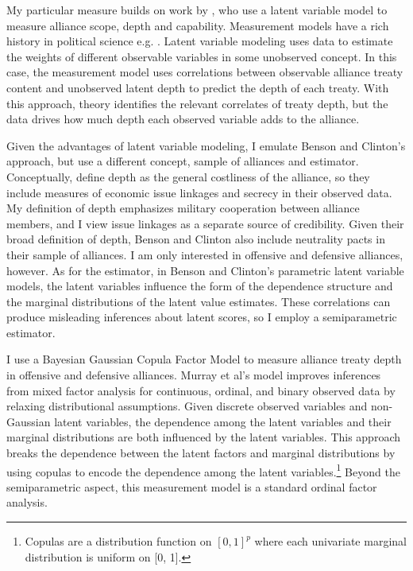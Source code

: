 \documentclass[12pt]{article}
\begin{document}
My particular measure builds on work by \citet{BensonClinton2016}, who use a latent variable model to measure alliance scope, depth and capability.  
Measurement models have a rich history in political science e.g. \citep{Clintonetal2004, Fariss2014}.
Latent variable modeling uses data to estimate the weights of different observable variables in some unobserved concept. 
In this case, the measurement model uses correlations between observable alliance treaty content and unobserved latent depth to predict the depth of each treaty. 
With this approach, theory identifies the relevant correlates of treaty depth, but the data drives how much depth each observed variable adds to the alliance.


Given the advantages of latent variable modeling, I emulate Benson and Clinton's approach, but use a different concept, sample of alliances and estimator. 
Conceptually, \citet{BensonClinton2016} define depth as the general costliness of the alliance, so they include measures of economic issue linkages and secrecy in their observed data.
My definition of depth emphasizes military cooperation between alliance members, and I view issue linkages as a separate source of credibility. 
Given their broad definition of depth, Benson and Clinton also include neutrality pacts in their sample of alliances.
I am only interested in offensive and defensive alliances, however.  
As for the estimator, in Benson and Clinton's parametric latent variable models, the latent variables influence the form of the dependence structure and the marginal distributions of the latent value estimates. 
These correlations can produce misleading inferences about latent scores, so I employ a semiparametric estimator.
 

I use a Bayesian Gaussian Copula Factor Model \citep{Murrayetal2013} to measure alliance treaty depth in offensive and defensive alliances. 
Murray et al's model improves inferences from mixed factor analysis for continuous, ordinal, and binary observed data by relaxing distributional assumptions.
Given discrete observed variables and non-Gaussian latent variables, the dependence among the latent variables and their marginal distributions are both influenced by the latent variables.
This approach breaks the dependence between the latent factors and marginal distributions by using copulas to encode the dependence among the latent variables.\footnote{Copulas are a distribution function on $[0, 1]^p$ where each univariate marginal distribution is uniform on [0, 1].}
Beyond the semiparametric aspect, this measurement model is a standard ordinal factor analysis.
\end{document}
